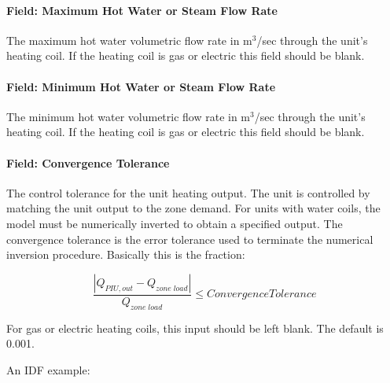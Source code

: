 \paragraph{Field: Maximum Hot Water or Steam Flow Rate}\label{field-maximum-hot-water-or-steam-flow-rate-4}

The maximum hot water volumetric flow rate in m\(^{3}\)/sec through the unit's heating coil. If the heating coil is gas or electric this field should be blank.

\paragraph{Field: Minimum Hot Water or Steam Flow Rate}\label{field-minimum-hot-water-or-steam-flow-rate-4}

The minimum hot water volumetric flow rate in m\(^{3}\)/sec through the unit's heating coil. If the heating coil is gas or electric this field should be blank.

\paragraph{Field: Convergence Tolerance}\label{field-convergence-tolerance-3}

The control tolerance for the unit heating output. The unit is controlled by matching the unit output to the zone demand. For units with water coils, the model must be numerically inverted to obtain a specified output. The convergence tolerance is the error tolerance used to terminate the numerical inversion procedure. Basically this is the fraction:

\begin{equation}
\frac{{\left| {{Q_{PIU,out}} - {Q_{zone\;load}}} \right|}}{{{Q_{zone\;load}}}} \le ConvergenceTolerance
\end{equation}

For gas or electric heating coils, this input should be left blank. The default is 0.001.

An IDF example:

